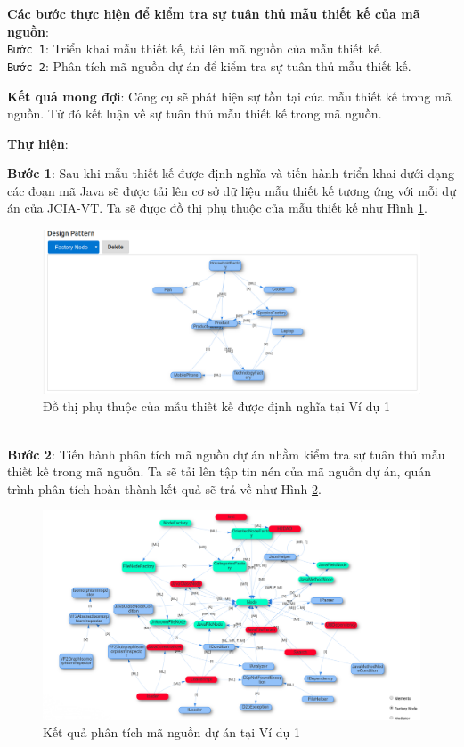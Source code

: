 \documentclass[12pt]{report}
\begin{document}
\noindent \textbf{Các bước thực hiện để kiểm tra sự tuân thủ mẫu thiết kế của mã nguồn}:\\
\texttt{Bước 1}: Triển khai mẫu thiết kế, tải lên mã nguồn của mẫu thiết kế.\\
\texttt{Bước 2}: Phân tích mã nguồn dự án để kiểm tra sự tuân thủ mẫu thiết kế.

\noindent \textbf{Kết quả mong đợi}: Công cụ sẽ phát hiện sự tồn tại của mẫu thiết kế trong mã nguồn. Từ đó kết luận về sự tuân thủ mẫu thiết kế trong mã nguồn.

\noindent \textbf{Thự hiện}:

\noindent \textbf{Bước 1}: Sau khi mẫu thiết kế được định nghĩa và tiến hành triển khai dưới dạng các đoạn mã Java sẽ được tải lên cơ sở dữ liệu mẫu thiết kế tương ứng với mỗi dự án của JCIA-VT. Ta sẽ được đồ thị phụ thuộc của mẫu thiết kế như Hình \ref{fig:node_fac_graph}.
\begin{figure}[h]
	\centering
	\includegraphics[scale=0.35]{images/node_fac_graph.png}
	\caption{Đồ thị phụ thuộc của mẫu thiết kế được định nghĩa tại Ví dụ 1}
	\label{fig:node_fac_graph}
\end{figure}\\
\noindent \textbf{Bước 2}: Tiến hành phân tích mã nguồn dự án nhằm kiểm tra sự tuân thủ mẫu thiết kế trong mã nguồn. Ta sẽ tải lên tập tin nén của mã nguồn dự án, quán trình phân tích hoàn thành kết quả sẽ trả về như Hình \ref{fig:result_example_1}.
\begin{figure}[h]
	\vspace{-0.1cm}
	\centering
	\includegraphics[scale=0.32]{images/node_fact_result.png}
	\caption{Kết quả phân tích mã nguồn dự án tại Ví dụ 1}
	\label{fig:result_example_1}
\end{figure}\\
\end{document}
